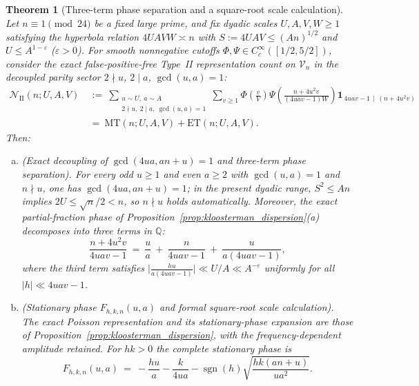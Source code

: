 \documentclass[11pt, a4paper]{article}
\theoremstyle{plain}
\newtheorem{theorem}{Theorem}[section]
\theoremstyle{definition}
\newcommand{\Q}{\mathbb{Q}}
\begin{document}
\begin{theorem}[Three-term phase separation and a square-root scale calculation]\label{thm:parseval_floor_law}
Let $n\equiv1\pmod{24}$ be a fixed large prime, and fix dyadic scales $U,A,V,W\ge1$ satisfying the hyperbola relation $4UAVW\asymp n$ with $S:=4UAV\le(An)^{1/2}$ and $U\le A^{1-\varepsilon}$ ($\varepsilon>0$). For smooth nonnegative cutoffs $\Phi,\Psi\in C_c^{\infty}([1/2,5/2])$, consider the exact false-positive-free Type~II representation count on $\mathcal{V}_n$ in the decoupled parity sector $2\nmid u$, $2\mid a$, $\gcd(u,a)=1$:
\begin{equation}\label{eq:N_II_dyadic_box}
\begin{split}
\mathcal{N}_{\mathrm{II}}(n;U,A,V)\ &:=\ \sum_{\substack{u\sim U,\ a\sim A\\ 2\nmid u,\ 2\mid a,\ \gcd(u,a)=1}}\sum_{v\ge1}\Phi\!\left(\frac{v}{V}\right)\Psi\!\left(\frac{n+4u^{2}v}{(4uav-1)W}\right)\mathbf{1}_{\,4uav-1\,\mid\,(n+4u^{2}v)}\\
&=\ \mathrm{MT}(n;U,A,V)+\mathrm{ET}(n;U,A,V).
\end{split}
\end{equation}
Then:
\begin{enumerate}[(a)]
    \item \emph{(Exact decoupling of $\gcd(4ua,an+u)=1$ and three-term phase separation).} For every odd $u\ge1$ and even $a\ge2$ with $\gcd(u,a)=1$ and $n\nmid u$, one has $\gcd(4ua,an+u)=1$; in the present dyadic range, $S^{2}\le An$ implies $2U\le\sqrt{n}/2<n$, so $n\nmid u$ holds automatically. Moreover, the exact partial-fraction phase of Proposition~\ref{prop:kloosterman_dispersion}(a) decomposes into three terms in $\Q$:
    \begin{equation}\label{eq:three_term_phase_separation}
    \frac{n+4u^{2}v}{4uav-1}\ =\ \frac{u}{a}\ +\ \frac{n}{4uav-1}\ +\ \frac{u}{a(4uav-1)},
    \end{equation}
    where the third term satisfies $\big|\frac{hu}{a(4uav-1)}\big|\ll U/A\ll A^{-\varepsilon}$ uniformly for all $|h|\ll 4uav-1$.
    \item \emph{(Stationary phase $F_{h,k,n}(u,a)$ and formal square-root scale calculation).} The exact Poisson representation and its stationary-phase expansion are those of Proposition~\ref{prop:kloosterman_dispersion}, with the frequency-dependent amplitude retained. For $hk>0$ the complete stationary phase is
    \begin{equation}\label{eq:real_archimedean_phase_Fhkn}
    F_{h,k,n}(u,a)\ =\ -\frac{hu}{a}-\frac{k}{4ua}-\operatorname{sgn}(h)\sqrt{\frac{hk(an+u)}{ua^{2}}}.

\end{equation}
\end{enumerate}
\end{theorem}
\end{document}
